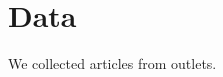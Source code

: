 \documentclass{article}
\begin{document}
\section{Data}
\label{sec:data}

We collected \nArticles{} articles from \nOutlets{} outlets.


\end{document}

